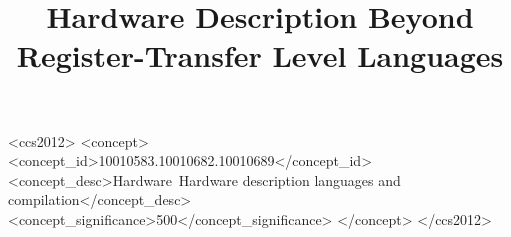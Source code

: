 \documentclass[sigconf]{acmart}
\begin{document}
\graphicspath{{./graphics/}}


\title{Hardware Description Beyond Register-Transfer Level Languages}


%




 \begin{CCSXML}
	<ccs2012>
	<concept>
	<concept_id>10010583.10010682.10010689</concept_id>
	<concept_desc>Hardware~Hardware description languages and compilation</concept_desc>
	<concept_significance>500</concept_significance>
	</concept>
	</ccs2012>
\end{CCSXML}
\end{document}
